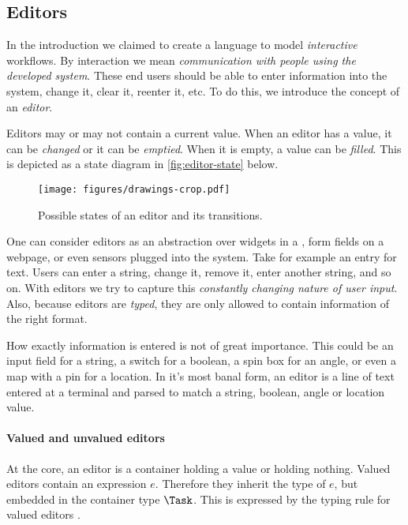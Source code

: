 \subsection{Editors}

In the introduction we claimed to create a language to model \emph{interactive} workflows.
By interaction we mean \emph{communication with people using the developed system}.
These end users should be able to enter information into the system,
change it, clear it, reenter it, etc.
To do this, we introduce the concept of an \emph{editor}.

Editors may or may not contain a current value.
When an editor has a value, it can be \emph{changed} or it can be \emph{emptied}.
When it is empty, a value can be \emph{filled}.
This is depicted as a state diagram in \autoref{fig:editor-state} below.

\begin{figure}[h]
  \centering
  \texttt{[image: figures/drawings-crop.pdf]}
  \caption{Possible states of an editor and its transitions.}
  \label{fig:editor-state}
\end{figure}

One can consider editors as an abstraction over widgets in a \GUI,
form fields on a webpage,
or even sensors plugged into the system.
Take for example an entry for text.
Users can enter a string, change it, remove it, enter another string, and so on.
With editors we try to capture this \emph{constantly changing nature of user input}.
Also, because editors are \emph{typed},
they are only allowed to contain information of the right format.

How exactly information is entered is not of great importance.
This could be an input field for a string,
a switch for a boolean,
a spin box for an angle,
or even a map with a pin for a location.
In it's most banal form,
an editor is a line of text entered at a terminal and parsed to match
a string, boolean, angle or location value.



\paragraph{Valued and unvalued editors}

At the core,
an editor is a container holding a value
or holding nothing.
Valued editors contain an expression $e$.
Therefore they inherit the type of $e$,
but embedded in the container type $\Task$.
This is expressed by the typing rule for valued editors .

